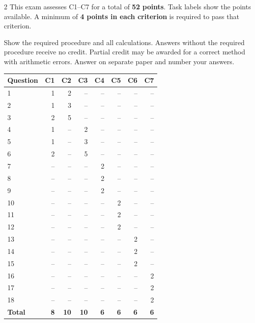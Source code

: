 \begin{multicols}{2}
\raggedcolumns
{}
This exam assesses C1--C7 for a total of \textbf{52 points}. Task labels show the points available. A minimum of \textbf{4 points in each criterion} is required to pass that criterion.

Show the required procedure and all calculations. Answers without the required procedure receive no credit. Partial credit may be awarded for a correct method with arithmetic errors. Answer on separate paper and number your answers.

\columnbreak
\begin{center}\small
\setlength{\tabcolsep}{3pt}
\renewcommand{\arraystretch}{1.05}
\begin{tabular}{@{}lrrrrrrr@{}}\toprule
Question&C1&C2&C3&C4&C5&C6&C7\\\midrule
1&1&2&--&--&--&--&--\\
2&1&3&--&--&--&--&--\\
3&2&5&--&--&--&--&--\\
4&1&--&2&--&--&--&--\\
5&1&--&3&--&--&--&--\\
6&2&--&5&--&--&--&--\\
7&--&--&--&2&--&--&--\\
8&--&--&--&2&--&--&--\\
9&--&--&--&2&--&--&--\\
10&--&--&--&--&2&--&--\\
11&--&--&--&--&2&--&--\\
12&--&--&--&--&2&--&--\\
13&--&--&--&--&--&2&--\\
14&--&--&--&--&--&2&--\\
15&--&--&--&--&--&2&--\\
16&--&--&--&--&--&--&2\\
17&--&--&--&--&--&--&2\\
18&--&--&--&--&--&--&2\\\midrule
\textbf{Total}&\textbf{8}&\textbf{10}&\textbf{10}&\textbf{6}&\textbf{6}&\textbf{6}&\textbf{6}\\\bottomrule
\end{tabular}
\end{center}
\end{multicols}
\clearpage
